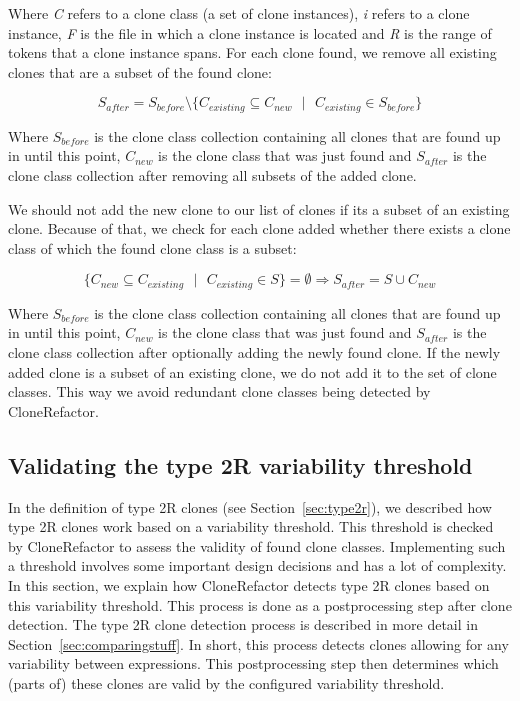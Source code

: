 Where \textit{C} refers to a clone class (a set of clone instances), \textit{i} refers to a clone instance, \textit{F} is the file in which a clone instance is located and \textit{R} is the range of tokens that a clone instance spans. For each clone found, we remove all existing clones that are a subset of the found clone:

\begin{equation}\label{eq:removeall}
S_{after} = S_{before} \setminus \{C_{existing} \subseteq C_{new}\text{ }|\text{ }C_{existing} \in S_{before}\}
\end{equation}

Where \textit{$S_{before}$} is the clone class collection containing all clones that are found up in until this point, \textit{$C_{new}$} is the clone class that was just found and \textit{$S_{after}$} is the clone class collection after removing all subsets of the added clone.

We should not add the new clone to our list of clones if its a subset of an existing clone. Because of that, we check for each clone added whether there exists a clone class of which the found clone class is a subset:

\begin{equation}\label{eq:removeexisting}
\{C_{new} \subseteq C_{existing}\text{ }|\text{ }C_{existing} \in S\} = \emptyset \Rightarrow S_{after} = S \cup C_{new}
\end{equation}

Where \textit{$S_{before}$} is the clone class collection containing all clones that are found up in until this point, \textit{$C_{new}$} is the clone class that was just found and \textit{$S_{after}$} is the clone class collection after optionally adding the newly found clone. If the newly added clone is a subset of an existing clone, we do not add it to the set of clone classes. This way we avoid redundant clone classes being detected by CloneRefactor.

\subsection{Validating the type 2R variability threshold}
In the definition of type 2R clones (see Section~\ref{sec:type2r}), we described how type 2R clones work based on a variability threshold. This threshold is checked by CloneRefactor to assess the validity of found clone classes. Implementing such a threshold involves some important design decisions and has a lot of complexity. In this section, we explain how CloneRefactor detects type 2R clones based on this variability threshold. This process is done as a postprocessing step after clone detection. The type 2R clone detection process is described in more detail in Section~\ref{sec:comparingstuff}. In short, this process detects clones allowing for any variability between expressions. This postprocessing step then determines which (parts of) these clones are valid by the configured variability threshold.

